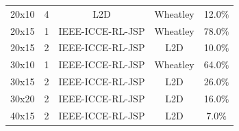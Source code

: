 \begin{table}
\begin{tabular}{ccccc}
        20x10 & 4 & L2D & Wheatley & 12.0$\%$ \\
        20x15 & 1 & IEEE-ICCE-RL-JSP & Wheatley & 78.0$\%$ \\
        20x15 & 2 & IEEE-ICCE-RL-JSP & L2D & 10.0$\%$ \\
        30x10 & 1 & IEEE-ICCE-RL-JSP & Wheatley & 64.0$\%$ \\
        30x15 & 2 & IEEE-ICCE-RL-JSP & L2D & 26.0$\%$ \\
        30x20 & 2 & IEEE-ICCE-RL-JSP & L2D & 16.0$\%$ \\
        40x15 & 2 & IEEE-ICCE-RL-JSP & L2D & 7.0$\%$ \\
        \bottomrule
        \end{tabular}        
\end{table}